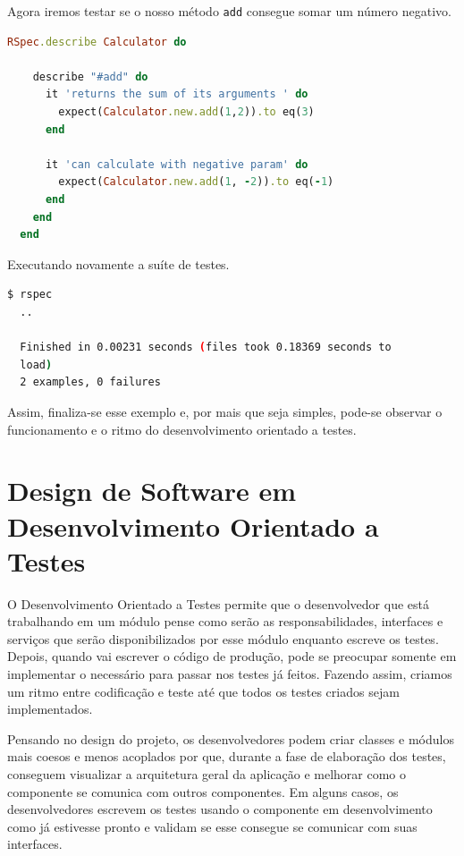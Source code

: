 \documentclass[12pt]{article}
\newcommand{\code}[1]{\texttt{#1}}
\begin{document}
  Agora iremos testar se o nosso método \code{add} consegue somar um número
  negativo.

  \begin{lstlisting}[language=Ruby]
  RSpec.describe Calculator do

    describe "#add" do
      it 'returns the sum of its arguments ' do
        expect(Calculator.new.add(1,2)).to eq(3)
      end

      it 'can calculate with negative param' do
        expect(Calculator.new.add(1, -2)).to eq(-1)
      end
    end
  end
  \end{lstlisting}

  Executando novamente a suíte de testes.

  \begin{lstlisting}[language=bash]
  $ rspec
  ..

  Finished in 0.00231 seconds (files took 0.18369 seconds to 
  load)
  2 examples, 0 failures
  \end{lstlisting}

  Assim, finaliza-se esse exemplo e, por mais que seja simples, 
  pode-se observar
  o funcionamento e o ritmo do desenvolvimento orientado a testes.

  \section{Design de Software em Desenvolvimento Orientado a Testes}

  O Desenvolvimento Orientado a Testes permite que o desenvolvedor que está 
  trabalhando 
  em um módulo pense como serão as responsabilidades, interfaces e serviços que 
  serão disponibilizados por esse módulo enquanto escreve os testes. 
  Depois, quando vai escrever o código de produção, pode se preocupar somente em
  implementar o necessário para passar nos testes já feitos. Fazendo assim, 
  criamos um ritmo entre codificação e teste até que todos os testes criados 
  sejam implementados.

  Pensando no design do projeto, os desenvolvedores podem criar
  classes e módulos mais coesos e menos acoplados por que, durante a fase de 
  elaboração dos testes, conseguem visualizar a arquitetura geral da aplicação e
  melhorar como o componente se comunica com outros 
  componentes. Em alguns casos, os desenvolvedores escrevem os testes usando o 
  componente em desenvolvimento como já estivesse pronto e validam se
  esse consegue se comunicar com suas interfaces.
\end{document}
